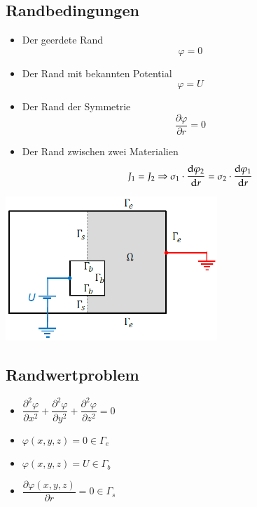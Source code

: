 \subsection{Randbedingungen}
\begin{minipage}{8cm}
	\begin{itemize}
		\item Der geerdete Rand \[\varphi = 0\]
		\item Der Rand mit bekannten Potential \[ \varphi = U \]
		\item Der Rand der Symmetrie \[ \dfrac{\partial\varphi}{\partial r} = 0\]
		\item Der Rand zwischen zwei Materialien \[J_{1}=J_{2} \Rightarrow \sigma_{1} \cdot \frac{\mathop{}\!\mathrm{d} \varphi_{2}}{\mathop{}\!\mathrm{d} r}=\sigma_{2} \cdot \frac{\mathop{}\!\mathrm{d} \varphi_{1}}{\mathop{}\!\mathrm{d} r}\]
	\end{itemize}
\end{minipage}
\begin{minipage}{8cm}
	\includegraphics[width=8cm]{images/randbedinung_ES.png}
\end{minipage}
\subsection{Randwertproblem}
\begin{multicols}{2}
	\begin{itemize}
		\item $\dfrac{\partial^2\varphi}{\partial x^2} +  \dfrac{\partial^2\varphi}{\partial y^2} + \dfrac{\partial^2\varphi}{\partial z^2}=0 $
		\item $\varphi(x,y,z)=0 \in \Gamma_e$
		\item $\varphi(x,y,z)=U \in \Gamma_b$
		\item $ \dfrac{\partial\varphi(x,y,z)}{\partial r} = 0 \in \Gamma_s$
	\end{itemize}
\end{multicols}
